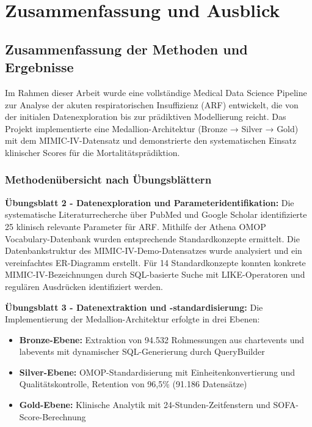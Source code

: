 \documentclass[12pt]{article}
\begin{document}
\section{Zusammenfassung und Ausblick}

\subsection{Zusammenfassung der Methoden und Ergebnisse}

Im Rahmen dieser Arbeit wurde eine vollständige Medical Data Science Pipeline zur Analyse der akuten respiratorischen Insuffizienz (ARF) entwickelt, die von der initialen Datenexploration bis zur prädiktiven Modellierung reicht. Das Projekt implementierte eine Medallion-Architektur (Bronze → Silver → Gold) mit dem MIMIC-IV-Datensatz und demonstrierte den systematischen Einsatz klinischer Scores für die Mortalitätsprädiktion.

\subsubsection{Methodenübersicht nach Übungsblättern}

\textbf{Übungsblatt 2 - Datenexploration und Parameteridentifikation:}
Die systematische Literaturrecherche über PubMed und Google Scholar identifizierte 25 klinisch relevante Parameter für ARF. Mithilfe der Athena OMOP Vocabulary-Datenbank wurden entsprechende Standardkonzepte ermittelt. Die Datenbankstruktur des MIMIC-IV-Demo-Datensatzes wurde analysiert und ein vereinfachtes ER-Diagramm erstellt. Für 14 Standardkonzepte konnten konkrete MIMIC-IV-Bezeichnungen durch SQL-basierte Suche mit LIKE-Operatoren und regulären Ausdrücken identifiziert werden.

\textbf{Übungsblatt 3 - Datenextraktion und -standardisierung:}
Die Implementierung der Medallion-Architektur erfolgte in drei Ebenen:
\begin{itemize}
    \item \textbf{Bronze-Ebene:} Extraktion von 94.532 Rohmessungen aus chartevents und labevents mit dynamischer SQL-Generierung durch QueryBuilder
    \item \textbf{Silver-Ebene:} OMOP-Standardisierung mit Einheitenkonvertierung und Qualitätskontrolle, Retention von 96,5\% (91.186 Datensätze)
    \item \textbf{Gold-Ebene:} Klinische Analytik mit 24-Stunden-Zeitfenstern und SOFA-Score-Berechnung
\end{itemize}
\end{document}
